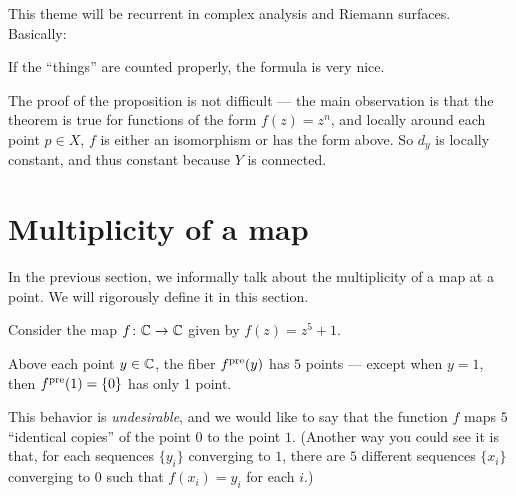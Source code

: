 This theme will be recurrent in complex analysis and Riemann surfaces. Basically:
\begin{moral}
	If the ``things'' are counted properly, the formula is very nice.
\end{moral}


The proof of the proposition is not difficult --- the main observation is that the theorem is true
for functions of the form $f(z) = z^n$, and locally around each point $p \in X$, $f$ is either an
isomorphism or has the form above.
So $d_y$ is locally constant, and thus constant because $Y$ is connected.


\section{Multiplicity of a map}

In the previous section, we informally talk about the multiplicity of a map at a point. We will
rigorously define it in this section.

\begin{example}
	Consider the map $f \colon \mathbb C \to \mathbb C$ given by $f(z) = z^5 + 1$.

	Above each point $y \in \mathbb C$, the fiber $f^{\text{pre}}(y)$ has $5$ points --- except when $y = 1$, then
	$f^{\text{pre}}(1) = \{ 0 \}$ has only 1 point.
\end{example}

This behavior is \emph{undesirable}, and we would like to say that the function $f$ maps $5$
``identical copies'' of the point $0$ to the point $1$.
(Another way you could see it is that, for each sequences $\{ y_i \}$ converging to $1$, there are
$5$ different sequences $\{ x_i \}$ converging to $0$ such that $f(x_i) = y_i$ for each $i$.)

